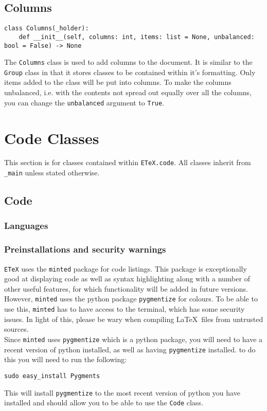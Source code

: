 \documentclass{article}
\begin{document}
\subsection{Columns}\label{subsec:columns}
\begin{verbatim}
class Columns(_holder):
	def __init__(self, columns: int, items: list = None, unbalanced: bool = False) -> None
\end{verbatim}
The \verb|Columns| class is used to add columns to the document. It is similar to the \verb|Group| class in that it stores classes to be contained within it's formatting. Only items added to the class will be put into columns. To make the columns unbalanced, i.e. with the contents not spread out equally over all the columns, you can change the \verb|unbalanced| argument to \verb|True|.
\section{Code Classes}\label{sec:code_classes}
This section is for classes contained within \verb|ETeX.code|. All classes inherit from \verb|_main| unless stated otherwise.
\subsection{Code}\label{subsec:code}

\subsubsection{Languages}\label{subsubsec:languages}

\subsubsection{Preinstallations and security warnings}\label{subsubsec:preinstallations_and_security_warnings}
\verb|ETeX| uses the \verb|minted| package for code listings. This package is exceptionally good at displaying code as well as syntax highlighting along with a number of other useful features, for which functionality will be added in future versions. However, \verb|minted| uses the python package \verb|pygmentize| for colours. To be able to use this, \verb|minted| has to have access to the terminal, which has some security issues. In light of this, please be wary when compiling \LaTeX\ files from untrusted sources.\\
Since \verb|minted| uses \verb|pygmentize| which is a python package, you will need to have a recent version of python installed, as well as having \verb|pygmentize| installed. to do this you will need to run the following:\begin{verbatim}
sudo easy_install Pygments
\end{verbatim}
This will install \verb|pygmentize| to the most recent version of python you have installed and should allow you to be able to use the \verb|Code| class.
\end{document}

